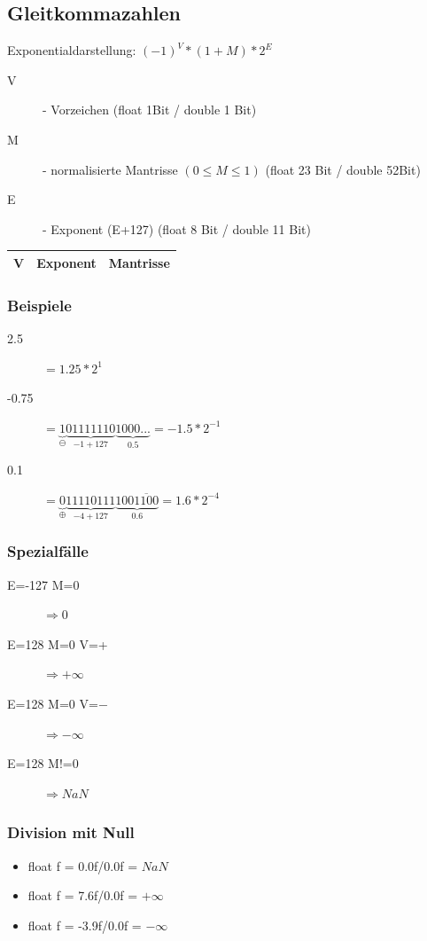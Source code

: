\documentclass[a4paper,10pt]{article}
\begin{document}
\subsection{Gleitkommazahlen}
Exponentialdarstellung: $(-1)^V * (1+M)*2^E$ \\
\begin{description}
	\item[V] - Vorzeichen (float 1Bit / double 1 Bit)
	\item[M] - normalisierte Mantrisse $(0 \leq M \leq 1)$ (float 23 Bit / double 52Bit)
	\item[E] - Exponent (E+127) (float 8 Bit / double 11 Bit)
\end{description} 
\begin{tabular}{|c|l|l|}
	\hline
	V & Exponent & Mantrisse \\
	\hline
\end{tabular}

\subsubsection{Beispiele}
\begin{description}
	\item[2.5] $=1.25*2^1$
	\item[-0.75] $=\underbrace{1}_{\ominus}\underbrace{01111110}_{-1+127}\underbrace{1000...}_{0.5}=-1.5*2^{-1}$
	\item[0.1] $=\underbrace{0}_{\oplus}\underbrace{11110111}_{-4+127}\underbrace{100\overline{1100}}_{0.6}=1.6*2^{-4}$
\end{description}

\subsubsection{Spezialfälle}
\begin{description}
	\item[E=-127 M=0] $\Rightarrow 0$
	\item[E=128 M=0 V=+] $\Rightarrow +\infty$
	\item[E=128 M=0 V=$-$] $\Rightarrow -\infty$
	\item[E=128 M!=0] $\Rightarrow NaN$
\end{description}

\subsubsection{Division mit Null}
\begin{itemize}
	\item float f = 0.0f/0.0f = $NaN$
	\item float f = 7.6f/0.0f = $+\infty$
	\item float f = -3.9f/0.0f = $-\infty$
\end{itemize}
\end{document}
